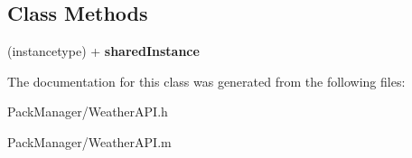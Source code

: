 \subsection*{Class Methods}
\begin{DoxyCompactItemize}
\item 
\hypertarget{interface_weather_a_p_i_a140d5b84ad32b8b208e8750882602040}{(instancetype) + {\bfseries shared\-Instance}}\label{interface_weather_a_p_i_a140d5b84ad32b8b208e8750882602040}

\end{DoxyCompactItemize}


The documentation for this class was generated from the following files\-:\begin{DoxyCompactItemize}
\item 
Pack\-Manager/Weather\-A\-P\-I.\-h\item 
Pack\-Manager/Weather\-A\-P\-I.\-m\end{DoxyCompactItemize}
